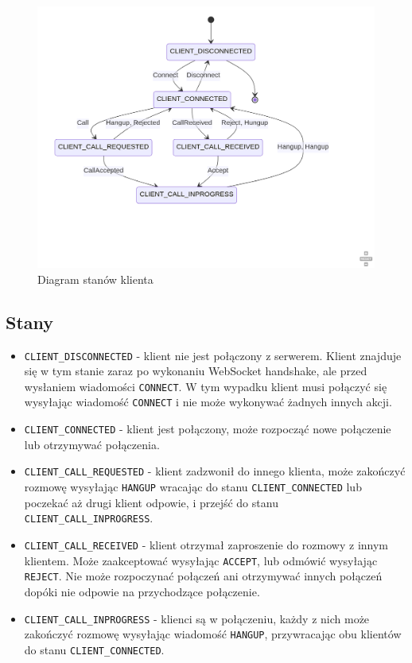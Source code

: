 \begin{figure}[H]
    \centering
    \includegraphics[width=.8\textwidth]{img/rozdzial3/state-diagram-2}
    \caption{Diagram stanów klienta}
    \label{fig:client_states}
\end{figure}

\subsection*{Stany}

\begin{itemize}
    \item \verb|CLIENT_DISCONNECTED| - klient nie jest połączony z serwerem. Klient znajduje się w
          tym stanie zaraz po wykonaniu WebSocket handshake, ale przed wysłaniem wiadomości
          \verb|CONNECT|. W tym wypadku klient musi połączyć się wysyłając wiadomość \verb|CONNECT|
          i nie może wykonywać żadnych innych akcji.
    \item \verb|CLIENT_CONNECTED| - klient jest połączony, może rozpocząć nowe połączenie lub
          otrzymywać połączenia.
    \item \verb|CLIENT_CALL_REQUESTED| - klient zadzwonił do innego klienta, może zakończyć rozmowę
          wysyłając \verb|HANGUP| wracając do stanu \verb|CLIENT_CONNECTED| lub poczekać aż drugi
          klient odpowie, i przejść do stanu \verb|CLIENT_CALL_INPROGRESS|.
    \item \verb|CLIENT_CALL_RECEIVED| - klient otrzymał zaproszenie do rozmowy z innym klientem.
          Może zaakceptować wysyłając \verb|ACCEPT|, lub odmówić wysyłając \verb|REJECT|. Nie może
          rozpoczynać połączeń ani otrzymywać innych połączeń dopóki nie odpowie na przychodzące
          połączenie.
    \item \verb|CLIENT_CALL_INPROGRESS| - klienci są w połączeniu, każdy z nich może zakończyć
          rozmowę wysyłając wiadomość \verb|HANGUP|, przywracając obu klientów do stanu
          \verb|CLIENT_CONNECTED|.
\end{itemize}

